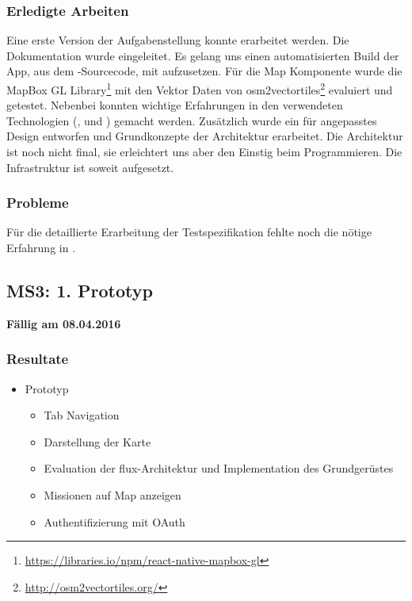 \subsubsection{Erledigte Arbeiten}
Eine erste Version der Aufgabenstellung konnte erarbeitet werden. 
Die Dokumentation wurde eingeleitet.
Es gelang uns einen automatisierten Build der App, aus dem -Sourcecode, mit  aufzusetzen.
Für die Map Komponente wurde die MapBox GL Library\footnote{\url{https://libraries.io/npm/react-native-mapbox-gl}} mit den Vektor Daten von osm2vectortiles\footnote{\url{http://osm2vectortiles.org/}} evaluiert und getestet.
Nebenbei konnten wichtige Erfahrungen in den verwendeten Technologien (,  und ) gemacht werden.
Zusätzlich wurde ein für  angepasstes Design entworfen und Grundkonzepte der Architektur erarbeitet.
Die Architektur ist noch nicht final, sie erleichtert uns aber den Einstig beim Programmieren.
Die Infrastruktur ist soweit aufgesetzt.

\subsubsection{Probleme}
Für die detaillierte Erarbeitung der Testspezifikation fehlte noch die nötige Erfahrung in .


\subsection{MS3: 1. Prototyp}
\label{pm-ms3}
\textbf{Fällig am 08.04.2016}
\subsubsection{Resultate}
\begin{itemize}
	\item {} Prototyp
	\begin{itemize}
		\item Tab Navigation
		\item Darstellung der Karte
		\item Evaluation der flux-Architektur und Implementation des Grundgerüstes
		\item Missionen auf Map anzeigen
		\item Authentifizierung mit \gls{OAuth}
	\end{itemize}
\end{itemize}

